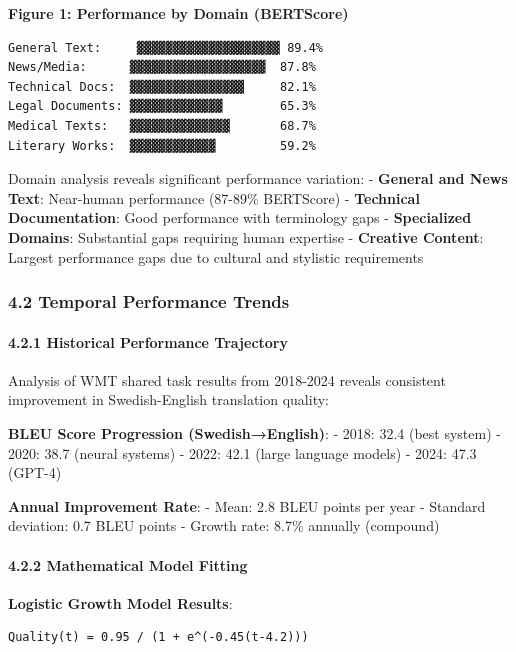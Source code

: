 \documentclass[12pt,a4paper]{article}
\begin{document}
{{{\textbf{Figure 1: Performance by Domain (BERTScore)}

\begin{verbatim}
General Text:     ▓▓▓▓▓▓▓▓▓▓▓▓▓▓▓▓▓▓▓▓ 89.4%
News/Media:      ▓▓▓▓▓▓▓▓▓▓▓▓▓▓▓▓▓▓▓  87.8%
Technical Docs:  ▓▓▓▓▓▓▓▓▓▓▓▓▓▓▓▓     82.1%
Legal Documents: ▓▓▓▓▓▓▓▓▓▓▓▓▓        65.3%
Medical Texts:   ▓▓▓▓▓▓▓▓▓▓▓▓▓▓       68.7%
Literary Works:  ▓▓▓▓▓▓▓▓▓▓▓▓         59.2%
\end{verbatim}

Domain analysis reveals significant performance variation: -
\textbf{General and News Text}: Near-human performance (87-89\%
BERTScore) - \textbf{Technical Documentation}: Good performance with
terminology gaps - \textbf{Specialized Domains}: Substantial gaps
requiring human expertise - \textbf{Creative Content}: Largest
performance gaps due to cultural and stylistic requirements

\hypertarget{temporal-performance-trends}{%
\subsubsection{4.2 Temporal Performance
Trends}\label{temporal-performance-trends}}

\hypertarget{historical-performance-trajectory}{%
\paragraph{4.2.1 Historical Performance
Trajectory}\label{historical-performance-trajectory}}

Analysis of WMT shared task results from 2018-2024 reveals consistent
improvement in Swedish-English translation quality:

\textbf{BLEU Score Progression (Swedish→English)}: - 2018: 32.4 (best
system) - 2020: 38.7 (neural systems) - 2022: 42.1 (large language
models) - 2024: 47.3 (GPT-4)

\textbf{Annual Improvement Rate}: - Mean: 2.8 BLEU points per year -
Standard deviation: 0.7 BLEU points - Growth rate: 8.7\% annually
(compound)

\hypertarget{mathematical-model-fitting}{%
\paragraph{4.2.2 Mathematical Model
Fitting}\label{mathematical-model-fitting}}

\textbf{Logistic Growth Model Results}:

\begin{verbatim}
Quality(t) = 0.95 / (1 + e^(-0.45(t-4.2)))
\end{verbatim}

}}}
\end{document}
